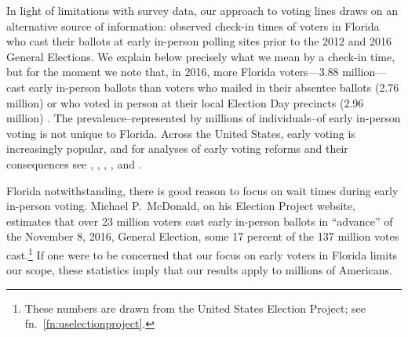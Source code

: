 \documentclass[12pt,titlepage]{article}
\begin{document}
In light of limitations with survey data, our approach to voting lines
draws on an alternative source of information: observed check-in times
of voters in Florida who cast their ballots at early in-person polling
sites prior to the 2012 and 2016 General Elections.  We explain below
precisely what we mean by a check-in time, but for the moment we note
that, in 2016, more Florida voters---3.88 million---cast early
in-person ballots than voters who mailed in their absentee ballots
(2.76 million) or who voted in person at their local Election Day
precincts (2.96 million) \citep{FDOS:2016vote}.  The
prevalence--represented by millions of individuals--of early in-person
voting is not unique to Florida. Across the United States, early
voting is increasingly popular, and for analyses of early voting
reforms and their consequences see
\citet{neelyrichardson:earlyvoting}, \citet{gronkebaum:growth},
\citet{gronketoffey:psychological}, \citet{gronke:2012}, and
\citet{burdenetal:unanticipated}.




Florida notwithstanding, there is good reason to focus on wait times
during early in-person voting.  Michael P.\ McDonald, on his Election
Project website, estimates that over 23 million voters cast early
in-person ballots in ``advance'' of the November 8, 2016, General
Election, some 17 percent of the 137 million votes
cast.\footnote{These numbers are drawn from the United States Election
  Project; see fn.\ \ref{fn:uselectionproject}.}  If one were to be
concerned that our focus on early voters in Florida limits our scope,
these statistics imply that our results apply to millions of
Americans.
\end{document}
